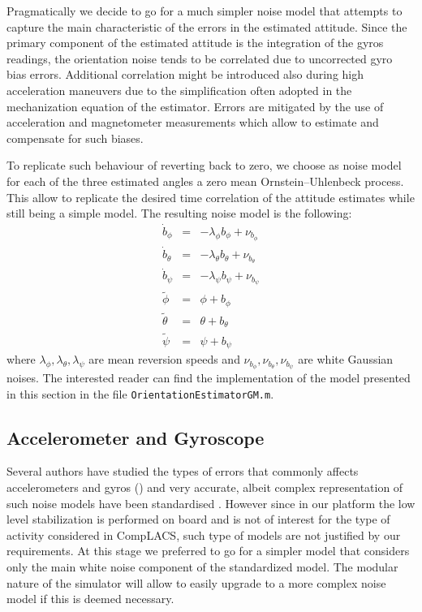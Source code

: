 \documentclass[a4paper,11pt]{report}
\begin{document}
Pragmatically we decide to go for a much simpler noise model that attempts to capture the main characteristic of the errors in the estimated attitude. 
Since the primary component of the estimated attitude is the integration of the gyros readings, the orientation noise tends to be correlated due to uncorrected gyro bias errors. 
Additional correlation might be introduced also during high acceleration maneuvers due to the simplification often adopted in the mechanization equation of the estimator.
Errors are mitigated by the use of acceleration and magnetometer measurements which allow to estimate and compensate for such biases.

To replicate such behaviour of reverting back to zero, we choose as noise model for each of the three estimated angles a zero mean Ornstein–Uhlenbeck process. This allow to replicate the desired time correlation of the attitude estimates while still being a simple model. The resulting noise model is the following:
\begin{eqnarray}
  \dot{b}_\phi &= &  - \lambda_\phi b_\phi + \nu_{b_\phi}\\
  \dot{b}_\theta &= &  - \lambda_\theta b_\theta + \nu_{b_\theta}\\
  \dot{b}_\psi &= &  - \lambda_\psi b_\psi + \nu_{b_\psi}\\
  \tilde{\phi} &=& \phi + b_\phi\\
  \tilde{\theta} &=& \theta + b_\theta\\
  \tilde{\psi} &=& \psi + b_\psi
\end{eqnarray}
where $\lambda_\phi,\lambda_\theta,\lambda_\psi$ are mean reversion speeds and  $\nu_{b_\phi},\nu_{b_\theta},\nu_{b_\psi}$ are white Gaussian noises.
The interested reader can find the implementation of the model presented in this section in the file \texttt{OrientationEstimatorGM.m}. 

\subsection{Accelerometer and Gyroscope}

Several authors have studied the types of errors that commonly affects accelerometers and gyros (\cite{han2011quantization}\cite{hou2003inertial}) and very accurate, albeit complex representation of such noise models have been standardised \cite{ieee2006standard}. However since in our platform the low level stabilization is performed on board and is not of interest for the type of activity considered in CompLACS, such type of models are not justified by our requirements. 
At this stage we preferred to go for a simpler model that considers only the main white noise component of the standardized model. The modular nature of the simulator will allow to easily upgrade to a more complex noise model if this is deemed necessary.
\end{document}
